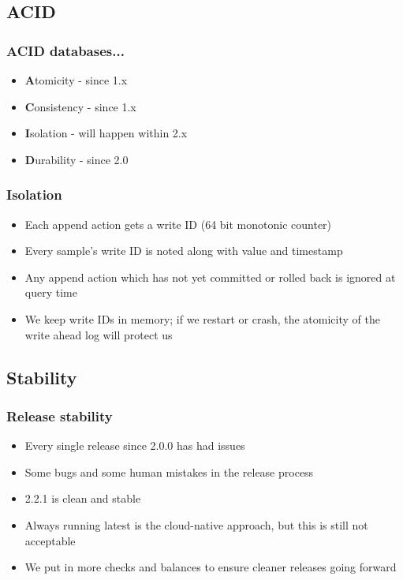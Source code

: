 \documentclass[t]{beamer}
\begin{document}
\subsection{ACID}

\begin{frame}
	\frametitle{ACID databases...}
	\begin{itemize}
		\item \textbf{A}tomicity - since 1.x
		\item \textbf{C}onsistency - since 1.x
		\item \textbf{I}solation - will happen within 2.x
		\item \textbf{D}urability - since 2.0
	\end{itemize}
\end{frame}

\begin{frame}
	\frametitle{Isolation}
	\begin{itemize}
		\item Each append action gets a write ID (64 bit monotonic counter)
		\item Every sample's write ID is noted along with value and timestamp
		\item Any append action which has not yet committed or rolled back is ignored at query time
		\item We keep write IDs in memory; if we restart or crash, the atomicity of the write ahead log will protect us
	\end{itemize}
\end{frame}


\subsection{Stability}

\begin{frame}
	\frametitle{Release stability}
	\begin{itemize}
		\item Every single release since 2.0.0 has had issues
		\item Some bugs and some human mistakes in the release process
		\item 2.2.1 is clean and stable
		\item Always running latest is the cloud-native approach, but this is still not acceptable
		\item We put in more checks and balances to ensure cleaner releases going forward
	\end{itemize}
\end{frame}
\end{document}
